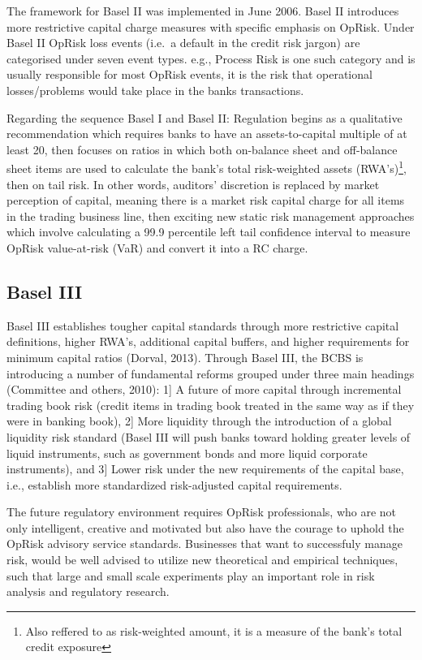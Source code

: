 \documentclass[]{DissertateUSU}
\let\rmarkdownfootnote\footnote%
\def\footnote{\protect\rmarkdownfootnote}
\begin{document}
The framework for Basel II was implemented in June 2006. Basel II
introduces more restrictive capital charge measures with specific
emphasis on OpRisk. Under Basel II OpRisk loss events (i.e.~a default in
the credit risk jargon) are categorised under seven event types. e.g.,
Process Risk is one such category and is usually responsible for most
OpRisk events, it is the risk that operational losses/problems would
take place in the banks transactions.\medskip

Regarding the sequence Basel I and Basel II: Regulation begins as a
qualitative recommendation which requires banks to have an
assets-to-capital multiple of at least 20, then focuses on ratios in
which both on-balance sheet and off-balance sheet items are used to
calculate the bank's total risk-weighted assets
(RWA's)\footnote{Also reffered to as risk-weighted amount, it is a measure of the bank's total credit exposure},
then on tail risk. In other words, auditors' discretion is replaced by
market perception of capital, meaning there is a market risk capital
charge for all items in the trading business line, then exciting new
static risk management approaches which involve calculating a 99.9
percentile left tail confidence interval to measure OpRisk value-at-risk
(VaR) and convert it into a RC charge.\medskip 

\subsection{Basel III}

Basel III establishes tougher capital standards through more restrictive
capital definitions, higher RWA's, additional capital buffers, and
higher requirements for minimum capital ratios (Dorval, 2013). Through
Basel III, the BCBS is introducing a number of fundamental reforms
grouped under three main headings (Committee and others, 2010): 1{]} A
future of more capital through incremental trading book risk (credit
items in trading book treated in the same way as if they were in banking
book), 2{]} More liquidity through the introduction of a global
liquidity risk standard (Basel III will push banks toward holding
greater levels of liquid instruments, such as government bonds and more
liquid corporate instruments), and 3{]} Lower risk under the new
requirements of the capital base, i.e., establish more standardized
risk-adjusted capital requirements.\medskip

The future regulatory environment requires OpRisk professionals, who are
not only intelligent, creative and motivated but also have the courage
to uphold the OpRisk advisory service standards. Businesses that want to
successfuly manage risk, would be well advised to utilize new
theoretical and empirical techniques, such that large and small scale
experiments play an important role in risk analysis and regulatory
research.
\end{document}
